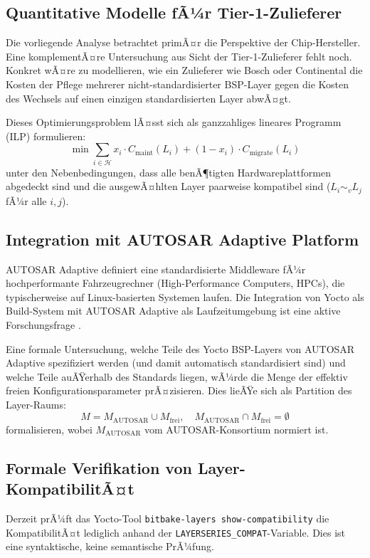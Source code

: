 ﻿\documentclass[a4paper,12pt]{article}
\theoremstyle{definition}
\begin{document}
\subsection{Quantitative Modelle fÃ¼r Tier-1-Zulieferer}

Die vorliegende Analyse betrachtet primÃ¤r die Perspektive der Chip-Hersteller.
Eine komplementÃ¤re Untersuchung aus Sicht der Tier-1-Zulieferer fehlt noch.
Konkret wÃ¤re zu modellieren, wie ein Zulieferer wie Bosch oder Continental
die Kosten der Pflege mehrerer nicht-standardisierter BSP-Layer gegen die
Kosten des Wechsels auf einen einzigen standardisierten Layer abwÃ¤gt.

Dieses Optimierungsproblem lÃ¤sst sich als ganzzahliges lineares Programm (ILP) formulieren:
\[
\min \sum_{i \in \mathcal{H}} x_i \cdot C_{\mathrm{maint}}(L_i) + (1 - x_i) \cdot C_{\mathrm{migrate}}(L_i)
\]
unter den Nebenbedingungen, dass alle benÃ¶tigten Hardwareplattformen abgedeckt sind
und die ausgewÃ¤hlten Layer paarweise kompatibel sind ($L_i \sim_v L_j$ fÃ¼r alle $i,j$).

\subsection{Integration mit AUTOSAR Adaptive Platform}

AUTOSAR Adaptive \cite{autosar2024} definiert eine standardisierte Middleware
fÃ¼r hochperformante Fahrzeugrechner (High-Performance Computers, HPCs),
die typischerweise auf Linux-basierten Systemen laufen. Die Integration von
Yocto als Build-System mit AUTOSAR Adaptive als Laufzeitumgebung ist eine
aktive Forschungsfrage \cite{thaler2022}.

Eine formale Untersuchung, welche Teile des Yocto BSP-Layers von AUTOSAR Adaptive
spezifiziert werden (und damit automatisch standardisiert sind) und welche
Teile auÃŸerhalb des Standards liegen, wÃ¼rde die Menge der effektiv freien
Konfigurationsparameter prÃ¤zisieren. Dies lieÃŸe sich als Partition des Layer-Raums:
\[
M = M_{\mathrm{AUTOSAR}} \cup M_{\mathrm{frei}}, \quad M_{\mathrm{AUTOSAR}} \cap M_{\mathrm{frei}} = \emptyset
\]
formalisieren, wobei $M_{\mathrm{AUTOSAR}}$ vom AUTOSAR-Konsortium normiert ist.

\subsection{Formale Verifikation von Layer-KompatibilitÃ¤t}

Derzeit prÃ¼ft das Yocto-Tool \texttt{bitbake-layers show-compatibility}
die KompatibilitÃ¤t lediglich anhand der \texttt{LAYERSERIES\_COMPAT}-Variable.
Dies ist eine syntaktische, keine semantische PrÃ¼fung.
\end{document}
